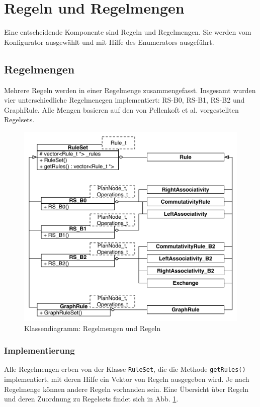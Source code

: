 \section{Regeln und Regelmengen}
Eine entscheidende Komponente sind Regeln und Regelmengen. Sie werden vom Konfigurator ausgewählt und mit Hilfe des Enumerators ausgeführt.

\subsection{Regelmengen}
Mehrere Regeln werden in einer Regelmenge zusammengefasst.
Insgesamt wurden vier unterschiedliche Regelmenegen implementiert: RS-B0, RS-B1, RS-B2 und GraphRule.
Alle Mengen basieren auf den von Pellenkoft et al. vorgestellten Regelsets.

\begin{figure}[ht]
  \centering
  \includegraphics[width=\textwidth]{04_Implementierung/00_media/RuleSets.pdf}
  \caption{Klassendiagramm: Regelmengen und Regeln}
  \label{RuleSetClass}
\end{figure}

\subsubsection{Implementierung}
\label{sec:RuleImplementation}

Alle Regelmengen erben von der Klasse \texttt{RuleSet}, die die Methode \texttt{getRules()} implementiert, mit deren Hilfe ein Vektor von Regeln ausgegeben wird. Je nach Regelmenge können andere Regeln vorhanden sein. Eine Übersicht über Regeln und deren Zuordnung zu Regelsets findet sich in Abb. \ref{RuleSetClass}.

